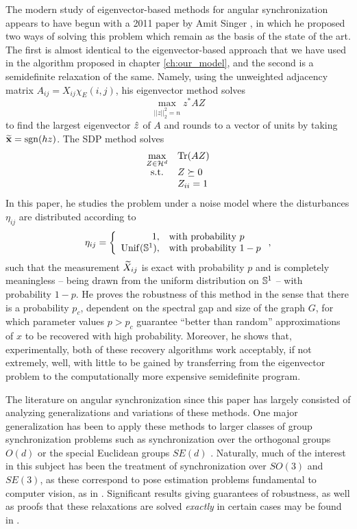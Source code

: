 The modern study of eigenvector-based methods for angular synchronization appears to have begun with a 2011 paper by Amit Singer \cite{singer2011ang_sync}, in which he proposed two ways of solving this problem which remain as the basis of the state of the art.  The first is almost identical to the eigenvector-based approach that we have used in the algorithm proposed in chapter \ref{ch:our_model}, and the second is a semidefinite relaxation of the same.  Namely, using the unweighted adjacency matrix $A_{ij} = X_{ij} \chi_E(i, j)$, his eigenvector method solves \[ \max_{||z||_2^2 = n} z^* A Z \] to find the largest eigenvector $\hat{z}$ of $A$ and rounds to a vector of units by taking $\widetilde{\mathbf{x}} = \operatorname{sgn}(hz)$.  The SDP method solves \begin{equation}\begin{array}{cl} \max\limits_{Z \in \mathcal{H}^d} & \operatorname{Tr}(A Z) \\ \text{s.t.} & Z \succeq 0 \\ & Z_{ii} = 1 \end{array} \label{eq:angsyncSDPsinger}\end{equation}  In this paper, he studies the problem under a noise model where the disturbances $\eta_{ij}$ are distributed according to \[\eta_{ij} = \left\{\begin{array}{r@{,\quad}l} 1 & \text{with probability}\ p \\ \mathrm{Unif}(\Sbb^1) & \text{with probability}\ 1 - p\end{array}\right.,\] such that the measurement $\widetilde{X}_{ij}$ is exact with probability $p$ and is completely meaningless -- being drawn from the uniform distribution on $\mathbb{S}^1$ -- with probability $1 - p$.  He proves the robustness of this method in the sense that there is a probability $p_c$, dependent on the spectral gap and size of the graph $G$, for which parameter values $p > p_c$ guarantee ``better than random'' approximations of $x$ to be recovered with high probability.  Moreover, he shows that, experimentally, both of these recovery algorithms work acceptably, if not extremely, well, with little to be gained by transferring from the eigenvector problem to the computationally more expensive semidefinite program.

The literature on angular synchronization since this paper has largely consisted of analyzing generalizations and variations of these methods.  One major generalization has been to apply these methods to larger classes of group synchronization problems such as synchronization over the orthogonal groups $O(d)$ or the special Euclidean groups $SE(d)$ \cite{Cheeger,briales2017cartan_sync,bandeira2016se_sync}.  Naturally, much of the interest in this subject has been the treatment of synchronization over $SO(3)$ and $SE(3)$, as these correspond to pose estimation problems fundamental to computer vision, as in \cite{enqvist2011nonsequential, olsson2017rot_avg, fischler1981ransac, govindu2006motion_avg}.  Significant results giving guarantees of robustness, as well as proofs that these relaxations are solved \emph{exactly} in certain cases may be found in \cite{alexeev2014phase, bandeira2016tightness, olsson2017rot_avg, bandeira2016se_sync}.
